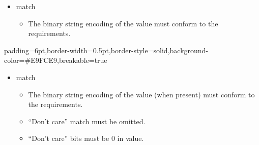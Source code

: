 \documentclass[11pt]{article}
\begin{document}
{%
\begin{itemize}[noitemsep,topsep=\mdcompacttopsep]%

\item{} match

\begin{itemize}[noitemsep,topsep=\mdcompacttopsep]%

\item{}The binary string encoding of the value must conform to the
 requirements.%
\end{itemize}%
\end{itemize}%

\begin{mdbmargintb}{6pt}{6pt}%
\begin{mdblock}{padding=6pt,border-width=0.5pt,border-style=solid,background-color=\#E9FCE9,breakable=true}%
\begin{mdpre}%
\end{mdpre}%
\end{mdblock}%
\end{mdbmargintb}%

\begin{itemize}[noitemsep,topsep=\mdcompacttopsep]%

\item{} match

\begin{itemize}[noitemsep,topsep=\mdcompacttopsep]%

\item{}The binary string encoding of the value (when present) must conform to the
 requirements.%

\item{}\textquotedblleft{}Don't care\textquotedblright{} match must be omitted.%

\item{}\textquotedblleft{}Don't care\textquotedblright{} bits must be 0 in value.%
\end{itemize}%
\end{itemize}%

}
\end{document}
